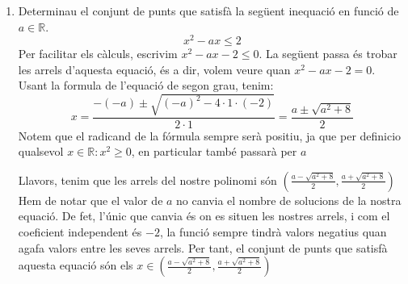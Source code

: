 \begin{enumerate}
    
    \item Determinau el conjunt de punts que satisfà la següent inequació en funció de $a \in \mathbb{R}$.
    \begin{equation}
        x^2-ax \leq 2
    \end{equation}
Per facilitar els càlculs, escrivim $x^2-ax-2 \leq 0$. La següent passa és trobar les arrels d'aquesta equació, és a dir, volem veure quan $x^2-ax-2=0$. Usant la formula de l'equació de segon grau, tenim:
\begin{equation*}
    x= \frac{-(-a) \pm \sqrt{(-a)^2-4 \cdot 1 \cdot (-2)}}{2 \cdot 1} = \frac{a \pm \sqrt{a^2+8}}{2}
\end{equation*}
Notem que el radicand de la fórmula sempre serà positiu, ja que per definicio qualsevol $x \in \mathbb{R}:x^2 \geq 0$, en particular també passarà per $a$

Llavors, tenim que les arrels del nostre polinomi són $(\frac{a-\sqrt{a^2+8}}{2},\frac{a+\sqrt{a^2+8}}{2})$\\

Hem de notar que el valor de $a$ no canvia el nombre de solucions de la nostra equació. De fet, l'únic que canvia és on es situen les nostres arrels, i com el coeficient independent és $-2$, la funció sempre tindrà valors negatius quan agafa valors entre les seves arrels. Per tant, el conjunt de punts que satisfà aquesta equació són els $x \in (\frac{a-\sqrt{a^2+8}}{2},\frac{a+\sqrt{a^2+8}}{2})$

\end{enumerate}
